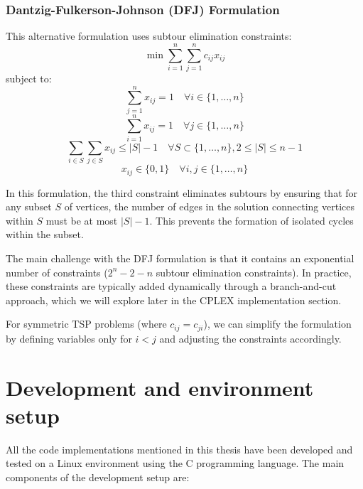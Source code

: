 \documentclass{article}
\begin{document}
\subsubsection{Dantzig-Fulkerson-Johnson (DFJ) Formulation}
This alternative formulation uses subtour elimination constraints:
\begin{equation}
	\min \sum_{i=1}^{n} \sum_{j=1}^{n} c_{ij} x_{ij}
\end{equation}
subject to:
\begin{equation}
	\sum_{j=1}^{n} x_{ij} = 1 \quad \forall i \in \{1, \ldots, n\}
\end{equation}
\begin{equation}
	\sum_{i=1}^{n} x_{ij} = 1 \quad \forall j \in \{1, \ldots, n\}
\end{equation}
\begin{equation}
	\sum_{i \in S} \sum_{j \in S} x_{ij} \leq |S| - 1 \quad \forall S \subset \{1, \ldots, n\}, 2 \leq |S| \leq n-1
\end{equation}
\begin{equation}
	x_{ij} \in \{0, 1\} \quad \forall i, j \in \{1, \ldots, n\}
\end{equation}

In this formulation, the third constraint eliminates subtours by ensuring that for any subset $S$ of vertices, the number of edges in the solution connecting vertices within $S$ must be at most $|S|-1$. This prevents the formation of isolated cycles within the subset.

The main challenge with the DFJ formulation is that it contains an exponential number of constraints ($2^n - 2 - n$ subtour elimination constraints). In practice, these constraints are typically added dynamically through a branch-and-cut approach, which we will explore later in the CPLEX implementation section.

For symmetric TSP problems (where $c_{ij} = c_{ji}$), we can simplify the formulation by defining variables only for $i < j$ and adjusting the constraints accordingly.


\newpage

\section{Development and environment setup}
All the code implementations mentioned in this thesis have been developed and tested on a Linux environment using the C programming language. The main components of the development setup are:
\end{document}
